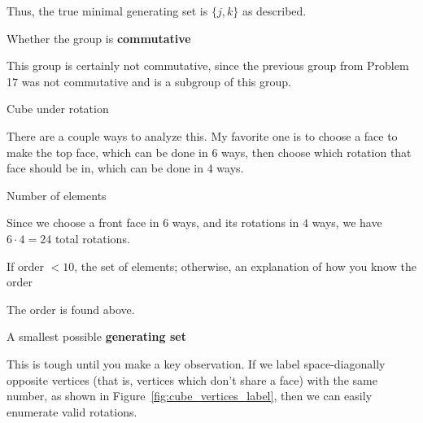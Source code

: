 \documentclass[../gatm_answers.tex]{subfiles}
\begin{document}
Thus, the true minimal generating set is $\{j,k\}$ as described.

\begin{inner_problem}
\item Whether the group is \textbf{commutative}
\end{inner_problem}

This group is certainly not commutative, since the previous group from Problem 17 was not commutative and is a subgroup of this group.

\begin{outer_problem}
\item Cube under rotation
\end{outer_problem}

There are a couple ways to analyze this. My favorite one is to choose a face to make the top face, which can be done in $6$ ways, then choose which rotation that face should be in, which can be done in $4$ ways.

\begin{inner_problem}[start=1]
\item Number of elements
\end{inner_problem}

Since we choose a front face in $6$ ways, and its rotations in $4$ ways, we have $6\cdot 4=24$ total rotations.

\begin{inner_problem}
\item If order $< 10$, the set of elements; otherwise, an explanation of how you know the order
\end{inner_problem}

The order is found above.

\begin{inner_problem}
\item A smallest possible \textbf{generating set}
\end{inner_problem}

This is tough until you make a key observation. If we label space-diagonally opposite vertices (that is, vertices which don't share a face) with the same number, as shown in Figure~\ref{fig:cube_vertices_label}, then we can easily enumerate valid rotations.
\end{document}
